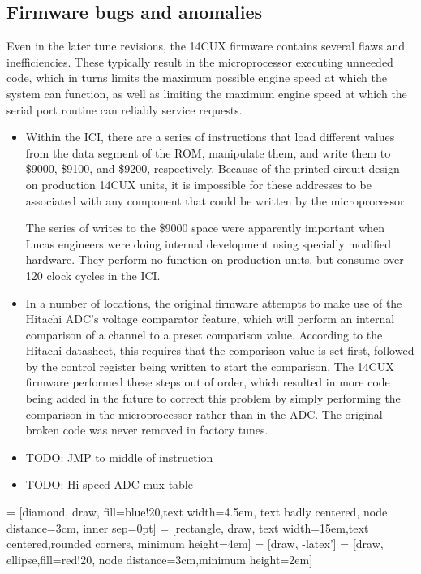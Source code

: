\documentclass[11pt,twocolumn]{scrartcl}
\begin{document}
\subsection {Firmware bugs and anomalies}
Even in the later tune revisions, the 14CUX firmware contains several flaws and inefficiencies. These typically result in the microprocessor executing unneeded code, which in turns limits the maximum possible engine speed at which the system can function, as well as limiting the maximum engine speed at which the serial port routine can reliably service requests.
\begin{itemize}
\item Within the ICI, there are a series of instructions that load different values from the data segment of the ROM, manipulate them, and write them to \$9000, \$9100, and \$9200, respectively. Because of the printed circuit design on production 14CUX units, it is impossible for these addresses to be associated with any component that could be written by the microprocessor.

The series of writes to the \$9000 space were apparently important when Lucas engineers were doing internal development using specially modified hardware. They perform no function on production units, but consume over 120 clock cycles in the ICI.

\item In a number of locations, the original firmware attempts to make use of the Hitachi ADC's voltage comparator feature, which will perform an internal comparison of a channel to a preset comparison value. According to the Hitachi datasheet, this requires that the comparison value is set first, followed by the control register being written to start the comparison. The 14CUX firmware performed these steps out of order, which resulted in more code being added in the future to correct this problem by simply performing the comparison in the microprocessor rather than in the ADC. The original broken code was never removed in factory tunes.

\item TODO: JMP to middle of instruction
\item TODO: Hi-speed ADC mux table

\end{itemize}

\newpage
\pagestyle{empty}

 = [diamond, draw, fill=blue!20,text width=4.5em, text badly centered, node distance=3cm, inner sep=0pt]
 = [rectangle, draw, text width=15em,text centered,rounded corners, minimum height=4em]
 = [draw, -latex']
 = [draw, ellipse,fill=red!20, node distance=3cm,minimum height=2em]
    
\end{document}
